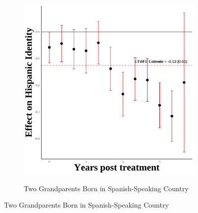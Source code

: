 \documentclass[12pt,english]{article}
\begin{document}
\begin{figure}[H]
\begin{subfigure}[b]{0.30\textwidth}
    \label{fig:third-gen-one}
  \end{subfigure}
  \hfill %
  \begin{subfigure}[b]{0.30\textwidth}
    \centering
    \caption{Two Grandparents Born in Spanish-Speaking Country}
    \includegraphics[width=\linewidth]{figures/thirdgen-two-hispanic_event_study.png}
    \label{fig:third-gen-two}
  \end{subfigure}

  \vspace{0.3cm} %


\end{figure}
\end{document}
